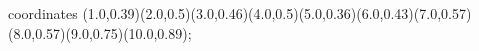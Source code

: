 					coordinates { (1.0,0.39)(2.0,0.5)(3.0,0.46)(4.0,0.5)(5.0,0.36)(6.0,0.43)(7.0,0.57)(8.0,0.57)(9.0,0.75)(10.0,0.89)};